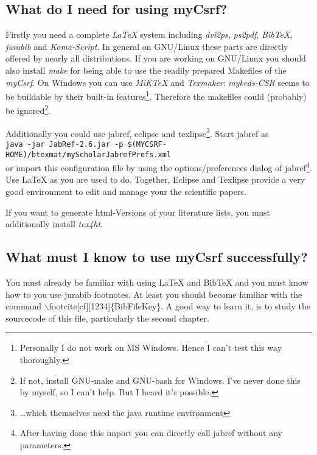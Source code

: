 \documentclass[
  DIV=calc,
  BCOR=5mm,
  11pt,
  headings=small,
  oneside,
  abstract=true,
  toc=bib,
  ngerman,english]{scrartcl}
\begin{document}
\subsection{What do I need for using myCsrf?}
Firstly you need a complete \textit{LaTeX} system including \textit{dvi2ps},
\textit{ps2pdf}, \textit{BibTeX}, \textit{jurabib} and \textit{Koma-Script}. In
general on GNU/Linux these parts are directly offered by nearly all
distributions. If you are working on GNU/Linux you should also install
\textit{make} for being able to use the readily prepared Makefiles of the
\textit{myCsrf}. On Windows you can use \textit{MiKTeX} and
\textit{Texmaker}: \textit{my\-keds-CSR} seems to be buildable by their built-in
features\footnote{Personally I do not work on MS Windows. Hence I can't test
this way thoroughly.}. Therefore the makefiles could (probably) be
ignored\footnote{If not, install GNU-make and GNU-bash for Windows. I've never
done this by myself, so I can't help. But I heard it's possible.}.

Additionally you could use jabref, eclipse and texlipse\footnote{\ldots which
themselves need the java runtime environment}. Start jabref as \\
\texttt{\footnotesize java -jar JabRef-2.6.jar -p
\$(MYCSRF-HOME)/btexmat/myScholarJabrefPrefs.xml}\\
or import this configuration file by using the options/preferences dialog of
jab\-ref\footnote{After having done this import you can directly call jabref
without any parameters.}. Use LaTeX as you are used to do. Together, Eclipse and
Texlipse provide a very good environment to edit and manage your the scientific
papers.

If you want to generate html-Versions of your literature lists, you must
additionally install \textit{tex4ht}.

\subsection{What must I know to use myCsrf successfully?}
You must already be familiar with using LaTeX and BibTeX and you must know how
to you use jurabib footnotes. At least you should become familiar with the
command $\backslash$footcite[cf][1234]\{BibFileKey\}. A good way to learn it, is to
study the sourcecode of this file, particularly the second chapter.
\end{document}
